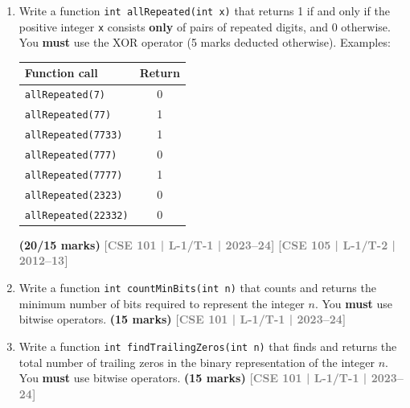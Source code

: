 \documentclass[12pt,a3paper]{article}
\newcommand{\yr}[1]{\hfill\textcolor{gray}{\small\textbf{[#1]}}}
\newcommand{\mk}[1]{\textcolor{orange!70!black}{\small\textbf{(#1 marks)}}}
\begin{document}
\begin{enumerate}
\item Write a function \texttt{int allRepeated(int x)} that returns 1 if and only if the positive integer \texttt{x} consists \textbf{only} of pairs of repeated digits, and 0 otherwise. You \textbf{must} use the XOR operator (5 marks deducted otherwise). Examples:
\begin{center}\small
\begin{tabular}{|l|c|}
\hline
\textbf{Function call} & \textbf{Return} \\ \hline
\texttt{allRepeated(7)}     & 0 \\ \hline
\texttt{allRepeated(77)}    & 1 \\ \hline
\texttt{allRepeated(7733)}  & 1 \\ \hline
\texttt{allRepeated(777)}   & 0 \\ \hline
\texttt{allRepeated(7777)}  & 1 \\ \hline
\texttt{allRepeated(2323)}  & 0 \\ \hline
\texttt{allRepeated(22332)} & 0 \\ \hline
\end{tabular}
\end{center}
\mk{20/15} \yr{CSE 101 | L-1/T-1 | 2023--24}
\yr{CSE 105 | L-1/T-2 | 2012--13}

\item Write a function \texttt{int countMinBits(int n)} that counts and returns the minimum number of bits required to represent the integer $n$. You \textbf{must} use bitwise operators.
\mk{15} \yr{CSE 101 | L-1/T-1 | 2023--24}

\item Write a function \texttt{int findTrailingZeros(int n)} that finds and returns the total number of trailing zeros in the binary representation of the integer $n$. You \textbf{must} use bitwise operators.
\mk{15} \yr{CSE 101 | L-1/T-1 | 2023--24}


\end{enumerate}
\end{document}
